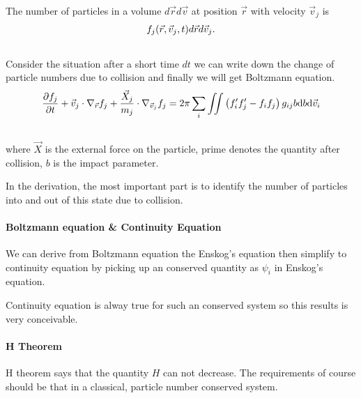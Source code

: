 \documentclass[letterpaper,10pt,english]{sphinxmanual}
\begin{document}
The number of particles in a volume $d\vec r d\vec v$ at position $\vec r$ with velocity $\vec v_j$ is
\begin{gather}
\begin{split}f_j(\vec r, \vec v_j,t)d\vec r d\vec v_j .\end{split}\notag\\\begin{split}\end{split}\notag
\end{gather}
Consider the situation after a short time $dt$ we can write down the change of particle numbers due to collision and finally we will get Boltzmann equation.
\begin{gather}
\begin{split}\frac{\partial f_j}{\partial t} + \vec v_j\cdot \nabla _ {\vec r}f_j + \frac{\vec X _ j}{m_j} \cdot \nabla_{\vec v_j} f_j = 2\pi \sum_i \iint \left(f _ i'f _ j' - f _ i f _ j\right) g _ {ij} b \mathrm db  \mathrm d \vec v_i\end{split}\notag\\\begin{split}\end{split}\notag
\end{gather}
where $\vec X$ is the external force on the particle, prime denotes the quantity after collision, $b$ is the impact parameter.

In the derivation, the most important part is to identify the number of particles into and out of this state due to collision.


\paragraph{Boltzmann equation \& Continuity Equation}
\label{nonequilibrium/week8:boltzmann-equation-continuity-equation}
We can derive from Boltzmann equation the Enskog's equation then simplify to continuity equation by picking up an conserved quantity as $\psi_i$ in Enskog's equation.

Continuity equation is alway true for such an conserved system so this results is very conceivable.


\paragraph{H Theorem}
\label{nonequilibrium/week8:h-theorem}
H theorem says that the quantity $H$ can not decrease. The requirements of course should be that in a classical, particle number conserved system.
\end{document}
